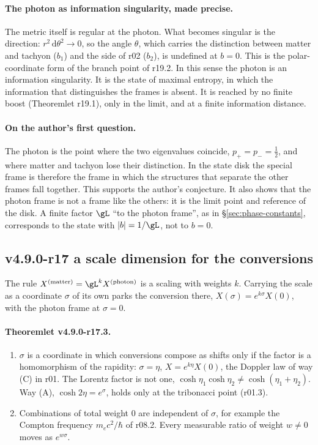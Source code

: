 \paragraph{The photon as information singularity, made precise.}
The metric itself is regular at the photon.  What becomes singular is the direction: \(r^2\,\mathrm d\theta^2\to0\), so the angle
\(\theta\), which carries the distinction between matter and tachyon (\(b_1\)) and the side of r02 (\(b_2\)), is undefined at
\(b=0\).  This is the polar-coordinate form of the branch point of r19.2.  In this sense the photon is an information
singularity.  It is the state of maximal entropy, in which the information that distinguishes the frames is absent.  It is
reached by no finite boost (Theoremlet r19.1), only in the limit, and at a finite information distance.

\paragraph{On the author's first question.}
The photon is the point where the two eigenvalues coincide, \(p_+=p_-=\tfrac12\), and where matter and tachyon lose their
distinction.  In the state disk the special frame is therefore the frame in which the structures that separate the other
frames fall together.  This supports the author's conjecture.  It also shows that the photon frame is not a frame like the
others: it is the limit point and reference of the disk.  A finite factor \(\gL\) ``to the photon frame'', as in
\S\ref{sec:phase-constants}, corresponds to the state with \(|b|=1/\gL\), not to \(b=0\).

\subsection*{v4.9.0-r17 a scale dimension for the conversions}
\label{subsec:v490-r17-scale}

The rule \(X^{(\mathrm{matter})}=\gL^{k}X^{(\mathrm{photon})}\) is a scaling with weights \(k\).  Carrying the scale as a coordinate
\(\sigma\) of its own parks the conversion there, \(X(\sigma)=e^{k\sigma}X(0)\), with the photon frame at \(\sigma=0\).

\paragraph{Theoremlet v4.9.0-r17.3.}
\begin{enumerate}[leftmargin=2em]
\item[(a)] \(\sigma\) is a coordinate in which conversions compose as shifts only if the factor is a homomorphism of the
rapidity: \(\sigma=\eta\), \(X=e^{k\eta}X(0)\), the Doppler law of way (C) in r01.  The Lorentz factor is not one,
\(\cosh\eta_1\cosh\eta_2\neq\cosh(\eta_1+\eta_2)\).  Way (A), \(\cosh2\eta=e^{\sigma}\), holds only at the tribonacci point (r01.3).
\item[(b)] Combinations of total weight \(0\) are independent of \(\sigma\), for example the Compton frequency
\(m_ec^2/\hbar\) of r08.2.  Every measurable ratio of weight \(w\neq0\) moves as \(e^{w\sigma}\).
\end{enumerate}

